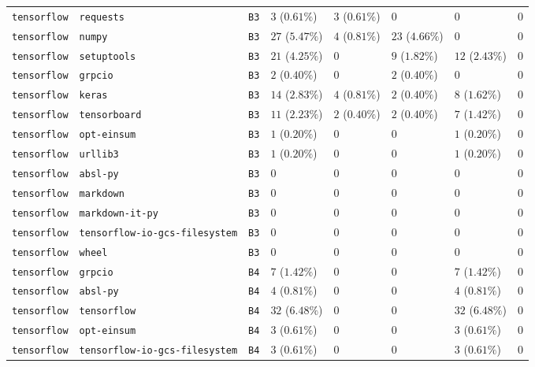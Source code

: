 \begin{table}
\begin{tabular}{llllllll}
\texttt{tensorflow} & \texttt{requests} & \texttt{B3} & $3$ ($0.61\%$) & $3$ ($0.61\%$) & $0$ & $0$ & $0$ \\
\texttt{tensorflow} & \texttt{numpy} & \texttt{B3} & $27$ ($5.47\%$) & $4$ ($0.81\%$) & $23$ ($4.66\%$) & $0$ & $0$ \\
\texttt{tensorflow} & \texttt{setuptools} & \texttt{B3} & $21$ ($4.25\%$) & $0$ & $9$ ($1.82\%$) & $12$ ($2.43\%$) & $0$ \\
\texttt{tensorflow} & \texttt{grpcio} & \texttt{B3} & $2$ ($0.40\%$) & $0$ & $2$ ($0.40\%$) & $0$ & $0$ \\
\texttt{tensorflow} & \texttt{keras} & \texttt{B3} & $14$ ($2.83\%$) & $4$ ($0.81\%$) & $2$ ($0.40\%$) & $8$ ($1.62\%$) & $0$ \\
\texttt{tensorflow} & \texttt{tensorboard} & \texttt{B3} & $11$ ($2.23\%$) & $2$ ($0.40\%$) & $2$ ($0.40\%$) & $7$ ($1.42\%$) & $0$ \\
\texttt{tensorflow} & \texttt{opt-einsum} & \texttt{B3} & $1$ ($0.20\%$) & $0$ & $0$ & $1$ ($0.20\%$) & $0$ \\
\texttt{tensorflow} & \texttt{urllib3} & \texttt{B3} & $1$ ($0.20\%$) & $0$ & $0$ & $1$ ($0.20\%$) & $0$ \\
\texttt{tensorflow} & \texttt{absl-py} & \texttt{B3} & $0$ & $0$ & $0$ & $0$ & $0$ \\
\texttt{tensorflow} & \texttt{markdown} & \texttt{B3} & $0$ & $0$ & $0$ & $0$ & $0$ \\
\texttt{tensorflow} & \texttt{markdown-it-py} & \texttt{B3} & $0$ & $0$ & $0$ & $0$ & $0$ \\
\texttt{tensorflow} & \texttt{tensorflow-io-gcs-filesystem} & \texttt{B3} & $0$ & $0$ & $0$ & $0$ & $0$ \\
\texttt{tensorflow} & \texttt{wheel} & \texttt{B3} & $0$ & $0$ & $0$ & $0$ & $0$ \\
\texttt{tensorflow} & \texttt{grpcio} & \texttt{B4} & $7$ ($1.42\%$) & $0$ & $0$ & $7$ ($1.42\%$) & $0$ \\
\texttt{tensorflow} & \texttt{absl-py} & \texttt{B4} & $4$ ($0.81\%$) & $0$ & $0$ & $4$ ($0.81\%$) & $0$ \\
\texttt{tensorflow} & \texttt{tensorflow} & \texttt{B4} & $32$ ($6.48\%$) & $0$ & $0$ & $32$ ($6.48\%$) & $0$ \\
\texttt{tensorflow} & \texttt{opt-einsum} & \texttt{B4} & $3$ ($0.61\%$) & $0$ & $0$ & $3$ ($0.61\%$) & $0$ \\
\texttt{tensorflow} & \texttt{tensorflow-io-gcs-filesystem} & \texttt{B4} & $3$ ($0.61\%$) & $0$ & $0$ & $3$ ($0.61\%$) & $0$ \\

\end{tabular}
\end{table}
